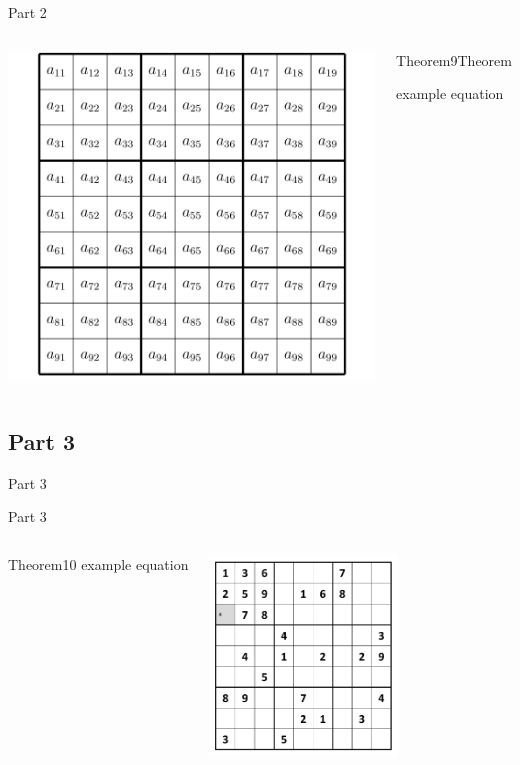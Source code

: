 \documentclass[xcolor=dvipsnames,table]{beamer}
\begin{document}
\begin{frame}{Part 2}
	\begin{columns}
		\begin{center}
			\includegraphics[height=.5\textheight]{images/imagem101.jpg}
		\end{center}
		\begin{block}{Theorem9}{Theorem}
		\begin{center}
			{example equation}
		\end{center}
		\end{block}
	\end{columns}
\end{frame}	

	
\subsection{Part 3}{Part 3}
	\begin{frame}{Part 3}
		\begin{columns}
			\column{.6 \textwidth}  		
		\begin{block}{Theorem10}{}
example equation
\end{block}
			\column{.4 \textwidth}  		
			\includegraphics[width=5cm]{images/imagem20}
		\end{columns}
	\end{frame}
\end{document}
